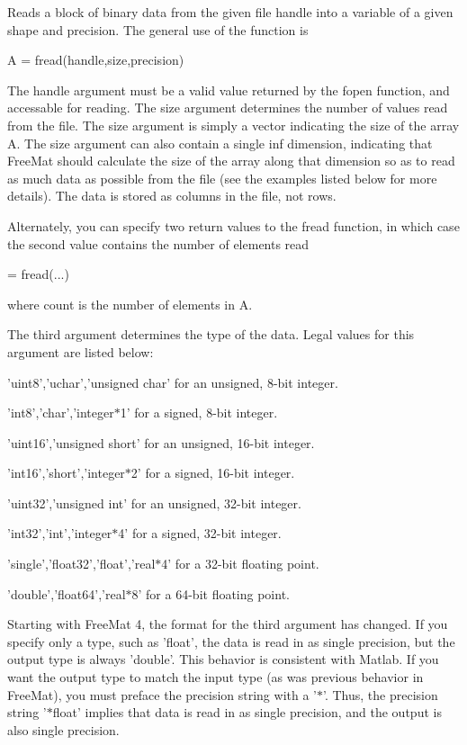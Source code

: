 Reads a block of binary data from the given file handle into a variable of a given shape and precision. The general use of the function is \begin{DoxyVerb}  A = fread(handle,size,precision)
\end{DoxyVerb}
 The {\ttfamily handle} argument must be a valid value returned by the fopen function, and accessable for reading. The {\ttfamily size} argument determines the number of values read from the file. The {\ttfamily size} argument is simply a vector indicating the size of the array {\ttfamily A}. The {\ttfamily size} argument can also contain a single {\ttfamily inf} dimension, indicating that Free\-Mat should calculate the size of the array along that dimension so as to read as much data as possible from the file (see the examples listed below for more details). The data is stored as columns in the file, not rows.

Alternately, you can specify two return values to the {\ttfamily fread} function, in which case the second value contains the number of elements read \begin{DoxyVerb}   [A,count] = fread(...)
\end{DoxyVerb}
 where {\ttfamily count} is the number of elements in {\ttfamily A}.

The third argument determines the type of the data. Legal values for this argument are listed below\-: 
\begin{DoxyItemize}
\item 'uint8','uchar','unsigned char' for an unsigned, 8-\/bit integer.  
\item 'int8','char','integer$\ast$1' for a signed, 8-\/bit integer.  
\item 'uint16','unsigned short' for an unsigned, 16-\/bit integer.  
\item 'int16','short','integer$\ast$2' for a signed, 16-\/bit integer.  
\item 'uint32','unsigned int' for an unsigned, 32-\/bit integer.  
\item 'int32','int','integer$\ast$4' for a signed, 32-\/bit integer.  
\item 'single','float32','float','real$\ast$4' for a 32-\/bit floating point.  
\item 'double','float64','real$\ast$8' for a 64-\/bit floating point.  
\end{DoxyItemize}

Starting with Free\-Mat 4, the format for the third argument has changed. If you specify only a type, such as {\ttfamily 'float'}, the data is read in as single precision, but the output type is always {\ttfamily 'double'}. This behavior is consistent with Matlab. If you want the output type to match the input type (as was previous behavior in Free\-Mat), you must preface the precision string with a {\ttfamily '$\ast$'}. Thus, the precision string {\ttfamily '$\ast$float'} implies that data is read in as single precision, and the output is also single precision.

